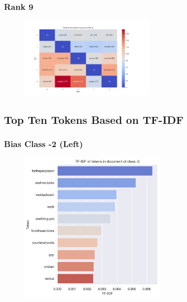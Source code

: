 \documentclass[11pt]{article}
\begin{document}
\subsubsection{Rank 9}
\begin{center}


\resizebox{\columnwidth}{!}
{
\TTRNFTable
}
\begin{figure}[h!]
  \includegraphics[width=0.6\textwidth]{figs/top_ten_rnf/rnf_w_rank_9.png}
\end{figure}
\end{center}

\pagebreak

\subsection{Top Ten Tokens Based on TF-IDF}
\subsubsection{Bias Class -2 (Left)}
\begin{center}


\TTTFIDFTable
\begin{figure}[h!]
  \includegraphics[width=0.65\textwidth]{figs/top_ten_tf_idf/tf_idf_token_-2.png}
\end{figure}
\end{center}
\end{document}
